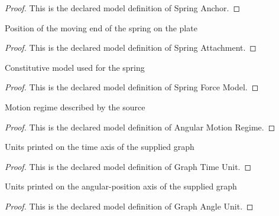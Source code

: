 \begin{proof}
  This is the declared model definition of Spring Anchor.
\end{proof}
\begin{definition}
  \label{def:physics:phyx-mini-0269:phyxminiproblems-problemphyxmini0269-springattachment}
  Position of the moving end of the spring on the plate
\end{definition}
\begin{proof}
  This is the declared model definition of Spring Attachment.
\end{proof}
\begin{definition}
  \label{def:physics:phyx-mini-0269:phyxminiproblems-problemphyxmini0269-springforcemodel}
  Constitutive model used for the spring
\end{definition}
\begin{proof}
  This is the declared model definition of Spring Force Model.
\end{proof}
\begin{definition}
  \label{def:physics:phyx-mini-0269:phyxminiproblems-problemphyxmini0269-angularmotionregime}
  Motion regime described by the source
\end{definition}
\begin{proof}
  This is the declared model definition of Angular Motion Regime.
\end{proof}
\begin{definition}
  \label{def:physics:phyx-mini-0269:phyxminiproblems-problemphyxmini0269-graphtimeunit}
  Units printed on the time axis of the supplied graph
\end{definition}
\begin{proof}
  This is the declared model definition of Graph Time Unit.
\end{proof}
\begin{definition}
  \label{def:physics:phyx-mini-0269:phyxminiproblems-problemphyxmini0269-graphangleunit}
  Units printed on the angular-position axis of the supplied graph
\end{definition}
\begin{proof}
  This is the declared model definition of Graph Angle Unit.
\end{proof}
